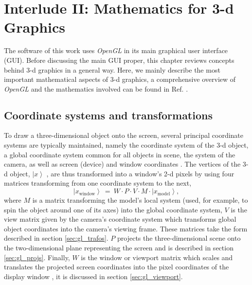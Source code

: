%
%

\chapter{Interlude II: Mathematics for 3-d Graphics}
\label{ch:gl}

The software of this work uses \textit{OpenGL} \cite{web_OpenGL} in its main graphical user interface (GUI).
Before discussing the main GUI proper, this chapter reviews concepts behind 3-d graphics in a general way.
Here, we mainly describe the most important mathematical aspects of 3-d graphics, a comprehensive overview of 
\textit{OpenGL} and the mathematics involved can be found in Ref. \cite{Sellers2002}.



\section{Coordinate systems and transformations}
To draw a three-dimensional object onto the screen, several principal coordinate systems are typically maintained,
namely the coordinate system of the 3-d object, a global coordinate system common for all objects in scene, the
system of the camera, as well as screen (device) and window coordinates \cite[pp. 63-66]{Sellers2002}.
The vertices of the 3-d object, $\left|x\right>$ , are thus transformed into a window's 2-d pixels by using four
matrices transforming from one coordinate system to the next,
\begin{equation}
	\boxed{\left|x_{\mathrm{window}}\right> \ =\ W \cdot P \cdot V \cdot  M \cdot  \left| x_{\mathrm{model}} \right>,}
	\label{eq:gl_mvp}
\end{equation}
where $M$ is a matrix transforming the model's local system (used, for example, to spin the object around one of
its axes) into the global coordinate system, $V$ is the view matrix given by the camera's coordinate system
which transforms global object coordinates into the camera's viewing frame. These matrices take the form
described in section \ref{sec:gl_trafos}.
$P$ projects the three-dimensional scene onto the two-dimensional plane representing the screen \cite{web_gl_ortho, web_gl_perspective} and is described in section \ref{sec:gl_projs}. 
Finally, $W$ is the window or viewport matrix which scales and translates the projected screen coordinates 
into the pixel coordinates of the display window \cite{web_gl_viewport}, it is discussed in section \ref{sec:gl_viewport}.


